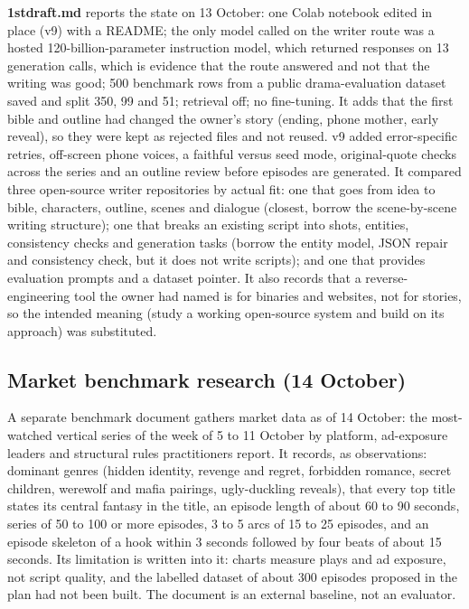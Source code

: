 \documentclass[11pt,a4paper]{article}
\begin{document}
\textbf{1stdraft.md} reports the state on 13 October: one Colab notebook edited in place (v9) with a README; the only model called on the writer route was a hosted 120-billion-parameter instruction model, which returned responses on 13 generation calls, which is evidence that the route answered and not that the writing was good; 500 benchmark rows from a public drama-evaluation dataset saved and split 350, 99 and 51; retrieval off; no fine-tuning. It adds that the first bible and outline had changed the owner's story (ending, phone mother, early reveal), so they were kept as rejected files and not reused. v9 added error-specific retries, off-screen phone voices, a faithful versus seed mode, original-quote checks across the series and an outline review before episodes are generated. It compared three open-source writer repositories by actual fit: one that goes from idea to bible, characters, outline, scenes and dialogue (closest, borrow the scene-by-scene writing structure); one that breaks an existing script into shots, entities, consistency checks and generation tasks (borrow the entity model, JSON repair and consistency check, but it does not write scripts); and one that provides evaluation prompts and a dataset pointer. It also records that a reverse-engineering tool the owner had named is for binaries and websites, not for stories, so the intended meaning (study a working open-source system and build on its approach) was substituted.

\subsection{Market benchmark research (14 October)}
A separate benchmark document gathers market data as of 14 October: the most-watched vertical series of the week of 5 to 11 October by platform, ad-exposure leaders and structural rules practitioners report. It records, as observations: dominant genres (hidden identity, revenge and regret, forbidden romance, secret children, werewolf and mafia pairings, ugly-duckling reveals), that every top title states its central fantasy in the title, an episode length of about 60 to 90 seconds, series of 50 to 100 or more episodes, 3 to 5 arcs of 15 to 25 episodes, and an episode skeleton of a hook within 3 seconds followed by four beats of about 15 seconds. Its limitation is written into it: charts measure plays and ad exposure, not script quality, and the labelled dataset of about 300 episodes proposed in the plan had not been built. The document is an external baseline, not an evaluator.
\end{document}
